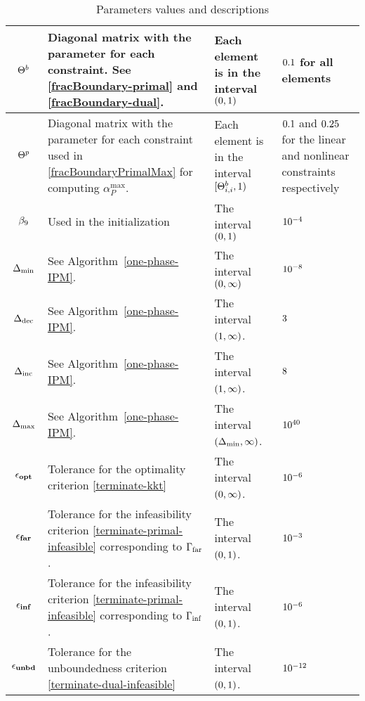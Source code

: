 \documentclass{article}
\begin{document}
\begin{table}[H]
\begin{tabular}{ |c| p{7cm}|p{4.0cm}| p{3cm}| }
\hline
 $\Theta^{b}$ & Diagonal matrix with the \fracBound{} parameter for each constraint. See \eqref{fracBoundary-primal} and \eqref{fracBoundary-dual}. & Each element is in the interval $(0,1)$ & $0.1$ for all elements \\ 
        \hline
$\Theta^{p}$ & Diagonal matrix with the \fracBound{} parameter for each constraint used in \eqref{fracBoundaryPrimalMax} for computing $\alpha_{P}^{\max}$. & Each element is in the interval $[\Theta^{b}_{i,i}, 1)$ & $0.1$ and $0.25$ for the linear and nonlinear constraints respectively \\
\hline
$\beta_{9}$  & Used in the initialization & The interval $(0,1)$ & $10^{-4}$ \\
\hline
$\Delta_{\min}$ & See Algorithm~\ref{one-phase-IPM}.  & The interval $(0,\infty)$ & $10^{-8}$ \\
\hline
$\Delta_{\text{dec}}$ & See Algorithm~\ref{one-phase-IPM}. &The interval $(1,\infty)$. & $3$ \\
\hline
$\Delta_{\text{inc}}$ & See Algorithm~\ref{one-phase-IPM}. &The interval $(1,\infty)$. & $8$ \\
\hline
$\Delta_{\max}$ & See Algorithm~\ref{one-phase-IPM}. &The interval $(\Delta_{\min},\infty)$. & $10^{40}$ \\
\hline
$\epsilon_{\textbf{opt}}$ & Tolerance for the optimality criterion \eqref{terminate-kkt} & The interval $(0,\infty)$. & $10^{-6}$  \\
\hline
$\epsilon_{\textbf{far}}$ & Tolerance for the infeasibility criterion \eqref{terminate-primal-infeasible} corresponding to $\Gamma_{\text{far}}$. & The interval $(0,1)$. & $10^{-3}$ \\
\hline
$\epsilon_{\textbf{inf}}$ & Tolerance for the infeasibility criterion \eqref{terminate-primal-infeasible} corresponding to $\Gamma_{\text{inf}}$. & The interval $(0,1)$. & $10^{-6}$ \\
\hline
$\epsilon_{\textbf{unbd}}$ & Tolerance for the unboundedness criterion \eqref{terminate-dual-infeasible} & The interval $(0,1)$. & $10^{-12}$ \\
\hline
\end{tabular}
\caption{Parameters values and descriptions}
\end{table}
\end{document}
